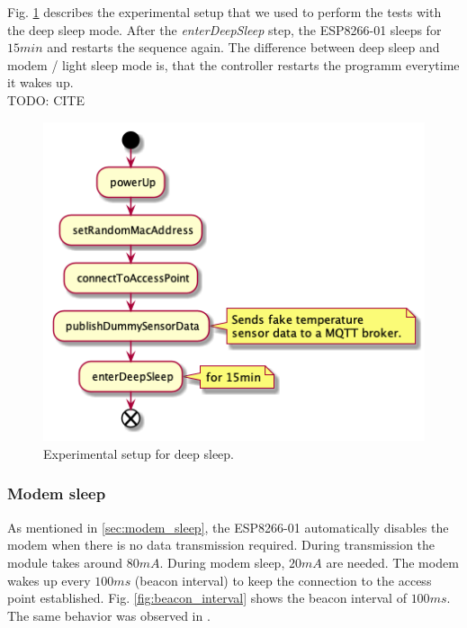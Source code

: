 Fig. \ref{fig:experiment_deep_sleep} describes the experimental setup that we used to perform the tests with the deep sleep mode.
After the \textit{enterDeepSleep} step, the ESP8266-01 sleeps for $15min$ and restarts the sequence again.
The difference between deep sleep and modem / light sleep mode is, that the controller restarts the programm everytime it wakes up.\\
TODO: CITE\\
\begin{figure}[H]
    \centering
    \includegraphics[width = 0.7 \linewidth]{fig/sequence_deep_sleep.png}
    \caption{Experimental setup for deep sleep.}
    \label{fig:experiment_deep_sleep}
\end{figure}

\subsubsection{Modem sleep}
As mentioned in \ref{sec:modem_sleep}, the ESP8266-01 automatically disables the modem when there is no data transmission required.
During transmission the module takes around $80mA$. During modem sleep, $20mA$ are needed.
The modem wakes up every $100ms$ (beacon interval) to keep the connection to the access point established.
Fig. \ref{fig:beacon_interval} shows the beacon interval of $100ms$. 
The same behavior was observed in \cite{montori_is_2017}.

